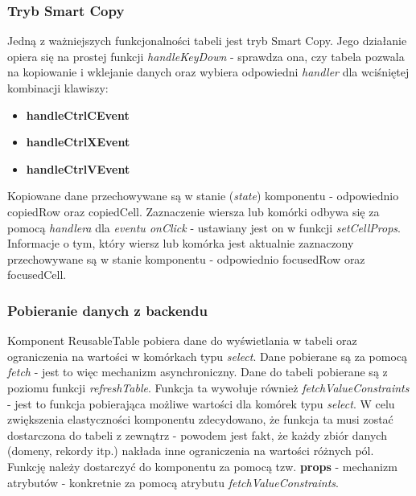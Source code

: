 \documentclass[11pt]{article}
\begin{document}
\subsubsection{Tryb Smart Copy}
Jedną z ważniejszych funkcjonalności tabeli jest tryb Smart Copy. Jego działanie opiera się na prostej funkcji \emph{handleKeyDown} - sprawdza ona, czy tabela pozwala na kopiowanie i wklejanie danych oraz wybiera odpowiedni \emph{handler} dla wciśniętej kombinacji klawiszy:
\begin{itemize}
\item \textbf{handleCtrlCEvent}
\item \textbf{handleCtrlXEvent}
\item \textbf{handleCtrlVEvent}
\end{itemize}
Kopiowane dane przechowywane są w stanie (\emph{state}) komponentu - odpowiednio copiedRow oraz copiedCell. \newline
Zaznaczenie wiersza lub komórki odbywa się za pomocą \emph{handlera} dla \emph{eventu onClick} - ustawiany jest on w funkcji \emph{setCellProps}. Informacje o tym, który wiersz lub komórka jest aktualnie zaznaczony przechowywane są w stanie komponentu - odpowiednio focusedRow oraz focusedCell.

\subsubsection{Pobieranie danych z backendu}
Komponent ReusableTable pobiera dane do wyświetlania w tabeli oraz ograniczenia na wartości w komórkach typu \emph{select}. Dane pobierane są za pomocą \emph{fetch} - jest to więc mechanizm asynchroniczny. Dane do tabeli pobierane są z poziomu funkcji \emph{refreshTable}. Funkcja ta wywołuje również \emph{fetchValueConstraints} - jest to funkcja pobierająca możliwe wartości dla komórek typu \emph{select}. W celu zwiększenia elastyczności komponentu zdecydowano, że funkcja ta musi zostać dostarczona do tabeli z zewnątrz - powodem jest fakt, że każdy zbiór danych (domeny, rekordy itp.) nakłada inne ograniczenia na wartości różnych pól. Funkcję należy dostarczyć do komponentu za pomocą tzw. \textbf{props} - mechanizm atrybutów - konkretnie za pomocą atrybutu \emph{fetchValueConstraints}.
\end{document}
